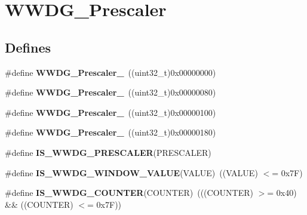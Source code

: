 \hypertarget{group__WWDG__Prescaler}{
\section{WWDG\_\-Prescaler}
\label{group__WWDG__Prescaler}
}
\subsection*{Defines}
\begin{DoxyCompactItemize}
\item 
\hypertarget{group__WWDG__Prescaler_ga55780dcf60a252724f5aae2ca37d91c5}{
\#define {\bfseries WWDG\_\-Prescaler\_}~((uint32\_\-t)0x00000000)}
\label{group__WWDG__Prescaler_ga55780dcf60a252724f5aae2ca37d91c5}

\item 
\hypertarget{group__WWDG__Prescaler_ga2ac67d0a7f8691b5ebf0d7d77d6b5f08}{
\#define {\bfseries WWDG\_\-Prescaler\_}~((uint32\_\-t)0x00000080)}
\label{group__WWDG__Prescaler_ga2ac67d0a7f8691b5ebf0d7d77d6b5f08}

\item 
\hypertarget{group__WWDG__Prescaler_gab11714e1816967802a8421587e54a2eb}{
\#define {\bfseries WWDG\_\-Prescaler\_}~((uint32\_\-t)0x00000100)}
\label{group__WWDG__Prescaler_gab11714e1816967802a8421587e54a2eb}

\item 
\hypertarget{group__WWDG__Prescaler_ga7a4933366603869726bd5ea547d99f02}{
\#define {\bfseries WWDG\_\-Prescaler\_}~((uint32\_\-t)0x00000180)}
\label{group__WWDG__Prescaler_ga7a4933366603869726bd5ea547d99f02}

\item 
\#define {\bfseries IS\_\-WWDG\_\-PRESCALER}(PRESCALER)
\item 
\hypertarget{group__WWDG__Prescaler_gab6ea714a2380b7d6547ba97363887868}{
\#define {\bfseries IS\_\-WWDG\_\-WINDOW\_\-VALUE}(VALUE)~((VALUE) $<$= 0x7F)}
\label{group__WWDG__Prescaler_gab6ea714a2380b7d6547ba97363887868}

\item 
\hypertarget{group__WWDG__Prescaler_ga4728877128cd60494692d8f14389112e}{
\#define {\bfseries IS\_\-WWDG\_\-COUNTER}(COUNTER)~(((COUNTER) $>$= 0x40) \&\& ((COUNTER) $<$= 0x7F))}
\label{group__WWDG__Prescaler_ga4728877128cd60494692d8f14389112e}

\end{DoxyCompactItemize}


